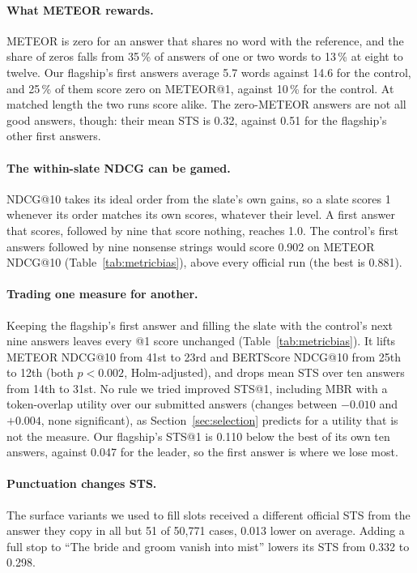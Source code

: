 \documentclass[sigconf,nonacm]{acmart}
\begin{document}
\paragraph{What METEOR rewards.}
METEOR is zero for an answer that shares no word with the reference, and the
share of zeros falls from 35\,\% of answers of one or two words to 13\,\% at
eight to twelve. Our flagship's first answers average 5.7 words against 14.6 for
the control, and 25\,\% of them score zero on METEOR@1, against 10\,\% for the
control. At matched length the two runs score alike. The zero-METEOR answers are
not all good answers, though: their mean STS is 0.32, against 0.51 for the
flagship's other first answers.

\paragraph{The within-slate NDCG can be gamed.}
NDCG@10 takes its ideal order from the slate's own gains, so a slate scores 1
whenever its order matches its own scores, whatever their level. A first answer
that scores, followed by nine that score nothing, reaches 1.0. The control's first answers followed by nine nonsense strings would score 0.902
on METEOR NDCG@10 (Table~\ref{tab:metricbias}), above every official run (the best is 0.881).

\paragraph{Trading one measure for another.}
Keeping the flagship's first answer and filling the slate with the control's
next nine answers leaves every @1 score unchanged (Table~\ref{tab:metricbias}). It lifts METEOR NDCG@10 from
41st to 23rd and BERTScore NDCG@10 from 25th to 12th (both $p<0.002$,
Holm-adjusted), and drops mean STS over ten answers from 14th to 31st. No rule we
tried improved STS@1, including MBR with a token-overlap utility over our
submitted answers (changes between $-0.010$ and $+0.004$, none significant), as
Section~\ref{sec:selection} predicts for a utility that is not the measure. Our
flagship's STS@1 is 0.110 below the best of its own ten answers, against 0.047
for the leader, so the first answer is where we lose most.

\paragraph{Punctuation changes STS\@.}
The surface variants we used to fill slots received a different official STS
from the answer they copy in all but 51 of 50,771 cases, 0.013 lower on average.
Adding a full stop to ``The bride and groom vanish into mist'' lowers its STS
from 0.332 to 0.298.
\end{document}
